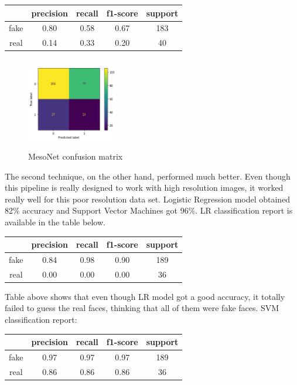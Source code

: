 \documentclass{bmvc2k}
\begin{document}
\begin{center}
\begin{tabular}{|c|c|c|c|c|}
  \hline
  & precision & recall & f1-score & support \\
  \hline
 fake & 0.80 & 0.58 & 0.67 & 183 \\ 
 \hline
 real &  0.14 & 0.33 & 0.20 & 40 \\
 \hline
\end{tabular}
\end{center}


\begin{figure}[!h]
\centering
\includegraphics[width=4cm, height=4cm]{Figs/mesoNet-confusion-matrix.png}
    \caption{MesoNet confusion matrix}
\end{figure}

The second technique, on the other hand, performed much better. Even though this pipeline is really designed to work with high resolution images, it worked really well for this poor resolution data set. Logistic Regression model obtained 82\% accuracy and Support Vector Machines got 96\%. LR classification report is available in the table below. 

\begin{center}
\begin{tabular}{|c|c|c|c|c|}
 \hline
  & precision & recall & f1-score & support \\
 \hline
 fake & 0.84 & 0.98 & 0.90 & 189 \\ 
 \hline
 real &  0.00 & 0.00 & 0.00 & 36 \\
 \hline
\end{tabular}
\end{center}


\vspace{0.6cm} Table above shows that even though LR model got a good accuracy, it totally failed to guess the real faces, thinking that all of them were fake faces. SVM classification report:

\begin{center}
\begin{tabular}{|c|c|c|c|c|}
 \hline
  & precision & recall & f1-score & support \\
 \hline
 fake & 0.97 & 0.97 & 0.97 & 189 \\ 
 \hline
 real &  0.86 & 0.86 & 0.86 & 36 \\
 \hline
\end{tabular}
\end{center}
\end{document}

